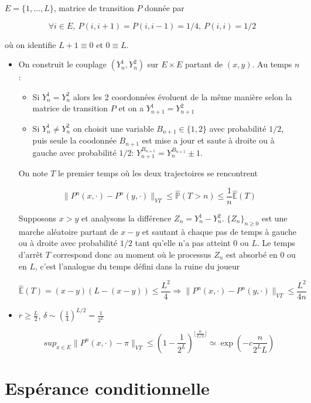 \documentclass[10pt,a4paper,oneside]{article}
\begin{document}
$E = \{1,\ldots,L\}$, matrice de transition $P$ donnée par

\[ \forall i \in E,\ P(i,i + 1) = P(i,i - 1) = 1/4,\ P(i,i) = 1/2 \]

où on identifie $L + 1 \equiv 0$ et $0 \equiv L$.

\begin{itemize}
\item
On construit le couplage $(Y_n^1,Y_n^2)$ sur $E \times E$ partant de $(x,y)$. Au temps $n$:

\begin{itemize}
\item
Si $Y_n^1 = Y_n^2$ alors les 2 coordonnées évoluent de la même manière selon la matrice de transition $P$ et on a $Y_{n + 1}^1 = Y_{n + 1}^2$

\item
Si $Y_n^1 \neq Y_n^2$ on choisit une variable $B_{n + 1} \in \{1,2\}$ avec probabilité $1/2$, puis seule la coodonnée $B_{n + 1}$ est mise a jour et saute à droite ou à gauche avec probabilité $1 / 2$: $Y_{n + 1}^{B_{n + 1}} = Y_n^{B_{n + 1}} \pm 1$.
\end{itemize} 

On note $T$ le premier temps où les deux trajectoires se rencontrent

\[ \| P^n(x,\cdot) - P^n(y,\cdot) \|_{VT} \leq \widehat{\mathbb{P}}(T > n) \leq \frac{1}{n}\widehat{\mathbb{E}}(T) \]

Supposons $x > y$ et analysons la différence $Z_n = Y_n^1 - Y_n^2$. $\{ Z_n \}_{n \geq 0}$ est une marche aléatoire partant de $x - y$ et sautant à chaque pas de temps à gauche ou à droite avec probabilité $1/2$ tant qu'elle n'a pas atteint $0$ ou $L$. Le temps d'arrêt $T$ correspond donc au moment où le processus $Z_n$ est absorbé en $0$ ou en $L$, c'est l'analogue du temps défini dans la ruine du joueur

\[ \widehat{\mathbb{E}}(T) = (x - y)(L - (x - y)) \leq \frac{L^2}{4} \Rightarrow \| P^n(x,\cdot) - P^n(y,\cdot) \|_{VT} \leq \frac{L^2}{4n} \]

\item
$r \geq \frac{L}{2}$, $\delta \sim \left( \frac{1}{4} \right)^{L / 2} = \frac{1}{2^L}$

\[ sup_{x \in E} \| P^n(x,\cdot) - \pi \|_{VT} \leq \left( 1 - \frac{1}{2^L} \right)^{ \lfloor \frac{n}{L / 2} \rfloor} \simeq \exp\left(-c \frac{n}{2^L L}\right) \]
\end{itemize}

\section{Espérance conditionnelle}
\end{document}
